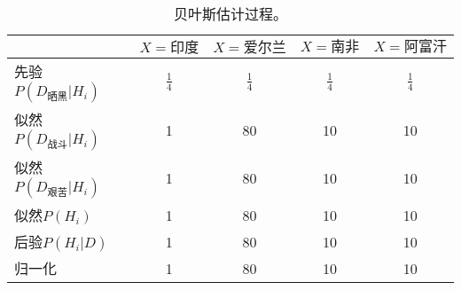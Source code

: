 \begin{table}
    \begin{tabular}{lcccc}
        \toprule
        & $X=印度$ & $X=爱尔兰$ & $X=南非$ & $X=阿富汗$\\
        \midrule
        先验$P(D_{晒黑}|H_i)$ & $\frac{1}{4}$ & $\frac{1}{4}$ & $\frac{1}{4}$ & $\frac{1}{4}$\\
        似然$P(D_{战斗}|H_i)$ & 1 & 80 & 10 & 10\\
        似然$P(D_{艰苦}|H_i)$ & 1 & 80 & 10 & 10\\
        似然$P(H_i)$ & 1 & 80 & 10 & 10\\
        \midrule
        后验$P(H_i|D)$ & 1 & 80 & 10 & 10\\
        归一化 & 1 & 80 & 10 & 10\\
        \bottomrule
    \end{tabular}
    \caption{贝叶斯估计过程。}
    \label{tab:bayes}
\end{table}